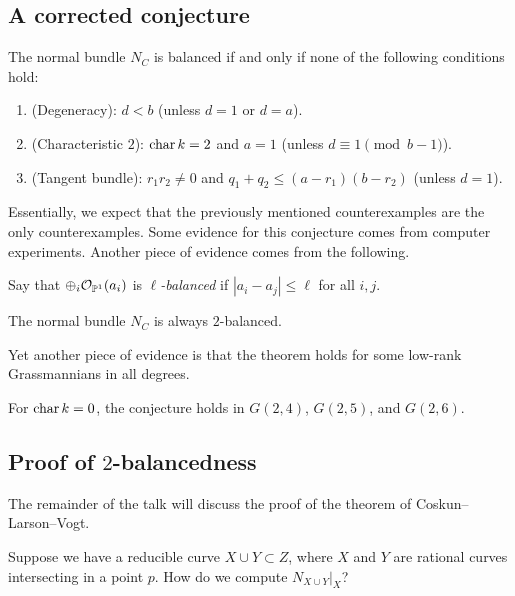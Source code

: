 \documentclass{article}
\begin{document}
\subsection{A corrected conjecture}

\begin{conj}
	The normal bundle $N_C$ is balanced if and only if none of the following conditions hold:
	\begin{enumerate}
		\item (Degeneracy): $d < b$ (unless $d = 1$ or $d = a$).
		\item (Characteristic $2$): $\operatorname{char} k = 2$ and $a = 1$ (unless $d \equiv 1 \pmod{b-1}$).
		\item (Tangent bundle): $r_1 r_2 \neq 0$ and $q_1 + q_2 \leq (a - r_1) (b - r_2)$ (unless $d = 1$).
	\end{enumerate}
\end{conj}

Essentially, we expect that the previously mentioned counterexamples are the only counterexamples.
Some evidence for this conjecture comes from computer experiments.
Another piece of evidence comes from the following.

\begin{dfn}
	Say that $\oplus_i \mathcal{O}_{\mathbb{P}^1}(a_i)$ is \emph{$\ell$-balanced} if $|a_i - a_j| \leq \ell$ for all $i, j$.
\end{dfn}

\begin{thm}
	The normal bundle $N_C$ is always $2$-balanced.
\end{thm}

Yet another piece of evidence is that the theorem holds for some low-rank Grassmannians in all degrees.

\begin{thm}[Cao]
	For $\operatorname{char} k = 0$, the conjecture holds in $G(2, 4)$, $G(2, 5)$, and $G(2, 6)$.
\end{thm}

\subsection{Proof of $2$-balancedness}

The remainder of the talk will discuss the proof of the theorem of Coskun--Larson--Vogt.

Suppose we have a reducible curve $X \cup Y \subset Z$, where $X$ and $Y$ are rational curves intersecting in a point $p$.
How do we compute $N_{X \cup Y}|_X$?
\end{document}
